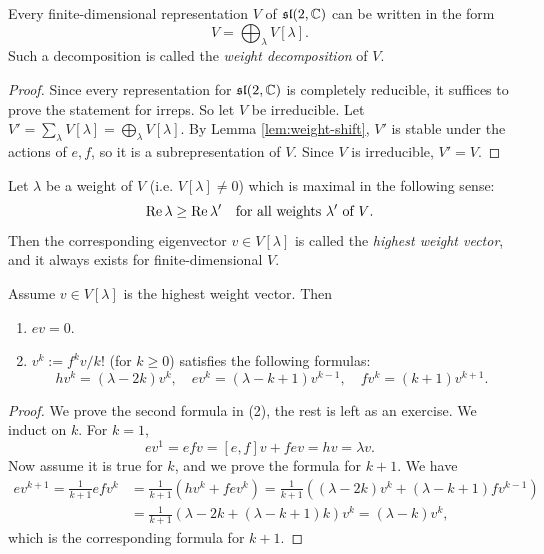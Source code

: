 \begin{theorem}
  Every finite-dimensional representation
  $V$ of $\mathfrak{sl}(2, \mathbb{C})$
  can be written in the form
  \[
    V = \bigoplus_\lambda V[\lambda].
  \]
  Such a decomposition is called the
  \emph{weight decomposition} of $V$.
\end{theorem}

\begin{proof}
  Since every representation for
  $\mathfrak{sl}(2, \mathbb{C})$ is
  completely reducible, it suffices to
  prove the statement for irreps.
  So let $V$ be irreducible.
  Let $V' = \sum_\lambda V[\lambda] = \bigoplus_\lambda V[\lambda]$.
  By Lemma \ref{lem:weight-shift}, $V'$ is
  stable under the
  actions of $e, f$, so it is a subrepresentation
  of $V$. Since $V$ is irreducible,
  $V' = V$.
\end{proof}

\begin{remark}
  Let $\lambda$ be a weight of $V$
  (i.e. $V[\lambda] \ne 0$) which is
  maximal in the following sense:
  \[
    \operatorname{Re} \lambda
    \ge \operatorname{Re} \lambda' \quad
    \text{for all weights } \lambda' \text{ of $V$}.
  \]
  Then the corresponding eigenvector
  $v \in V[\lambda]$ is called the
  \emph{highest weight vector}, and it
  always exists for finite-dimensional
  $V$.
\end{remark}

\begin{lemma}\label{lem:formulas-highest-weight}
  Assume $v \in V[\lambda]$ is the
  highest weight vector. Then
  \begin{enumerate}
    \item $ev = 0$.
    \item $v^k := f^k v / k!$
      (for $k \ge 0$) satisfies the following
      formulas:
      \[
        hv^k = (\lambda - 2k)v^k, \quad
        ev^k = (\lambda - k + 1) v^{k - 1}, \quad
        f v^k = (k + 1) v^{k + 1}.
      \]
  \end{enumerate}
\end{lemma}

\begin{proof}
  We prove the second formula in (2), the
  rest is left as an exercise. We induct
  on $k$. For $k = 1$,
  \[
    ev^1 = ef v = [e, f] v + fe v
    = hv = \lambda v.
  \]
  Now assume it is true for $k$, and
  we prove the formula for $k + 1$. We
  have
  \begin{align*}
    e v^{k + 1}
    = \frac{1}{k + 1} ef v^k
    &= \frac{1}{k + 1}(hv^k + fe v^k)
    = \frac{1}{k + 1}((\lambda - 2k)v^k + (\lambda - k + 1) f v^{k - 1}) \\
    &= \frac{1}{k + 1}(\lambda - 2k + (\lambda - k + 1) k)v^k
    = (\lambda - k) v^k,
  \end{align*}
  which is the corresponding formula for
  $k + 1$.
\end{proof}

